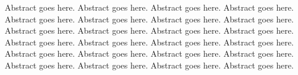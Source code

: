 Abstract goes here. Abstract goes here. Abstract goes here. Abstract goes here.
Abstract goes here. Abstract goes here. Abstract goes here. Abstract goes here.
Abstract goes here. Abstract goes here. Abstract goes here. Abstract goes here.
Abstract goes here. Abstract goes here. Abstract goes here. Abstract goes here.
Abstract goes here. Abstract goes here. Abstract goes here. Abstract goes here.
Abstract goes here. Abstract goes here. Abstract goes here. Abstract goes here.

